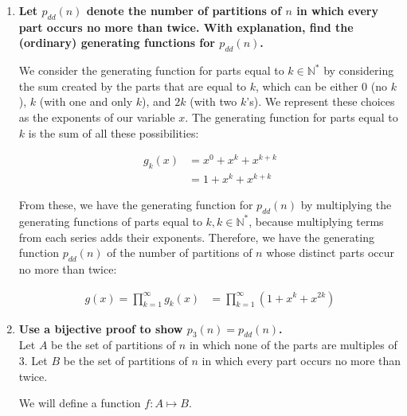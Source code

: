 \documentclass[10pt]{article}
\begin{document}
\begin{enumerate}
\begin{enumerate}
    \begin{align*}
        f(x) &= \prod\limits^{\infty}_{k=0} f_{3k+1}(x) \cdot \prod\limits^{\infty}_{k=0} f_{3k+2}(x)\\
        &= \prod\limits^{\infty}_{k=0} \frac{1}{(1-x^{3k+1})} \cdot \prod\limits^{\infty}_{k=0} \frac{1}{ (1-x^{3k+2})}\\
        &= \prod\limits^{\infty}_{k=0} \frac{1}{(1-x^{3k+1})\cdot (1-x^{3k+2})}
    \end{align*}

	\item
\textbf{Let $p_{dd}(n)$ denote the number of partitions of $n$ in which every part occurs no more than twice. With explanation, find the (ordinary) generating functions for $p_{dd}(n)$.}

We consider the generating function for parts equal to $k \in \mathbb{N}^*$ by considering the sum created by the parts that are equal to $k$, which can be either $0$ (no $k$), $k$ (with one and only $k$), and $2k$ (with two $k$'s). We represent these choices as the exponents of our variable $x$. The generating function for parts equal to $k$ is the sum of all these possibilities:

\begin{align*}
g_{k}(x) &= x^0+x^{k}+x^{k+k}\\
    &= 1 + x^k +x^{k+k}
\end{align*}

From these, we have the generating function for $p_{dd}(n)$ by multiplying the generating functions of parts equal to $k, k \in \mathbb{N}^*$, because multiplying terms from each series adds their exponents. Therefore, we have the generating function $p_{dd}(n)$ of the number of partitions of $n$ whose distinct parts occur no more than twice: 

\begin{align*}
    g(x) = \prod\limits^{\infty}_{k=1} g_{k}(x)&= \prod\limits^{\infty}_{k=1} (1 + x^k + x^{2k}) 
\end{align*}

	\item
\textbf{Use a bijective proof to show $p_3(n)=p_{dd}(n)$.}\\

    Let $A$ be the set of partitions of $n$ in which none of the parts are multiples of $3$. Let $B$ be the set of partitions of $n$ in which every part occurs no more than twice. 
    
    We will define a function $f: A \mapsto B$.
    

\end{enumerate}
\end{enumerate}
\end{document}
